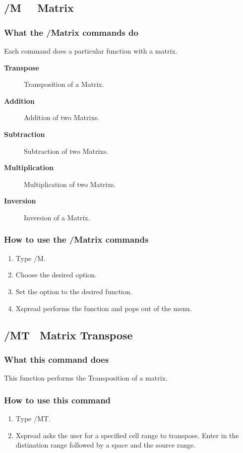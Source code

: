 \subsection*{/M \ \      Matrix}

\subsubsection*{What the /Matrix commands do}
Each command does a particular function with a matrix.

\begin{description}
\item[{\bf Transpose}]{Transposition of a Matrix.}
\item[{\bf Addition}]{Addition of two Matrixs.}
\item[{\bf Subtraction}]{Subtraction of two Matrixs.}
\item[{\bf Multiplication}]{Multiplication of two Matrixs.}
\item[{\bf Inversion}]{Inversion of a Matrix.}
\end{description}

\subsubsection*{How to use the /Matrix commands}
\begin{enumerate}
\item{Type /M.}
\item{Choose the desired option.}
\item{Set the option to the desired function.}
\item{Xspread performs the function and pops out of the menu.}
\end{enumerate}

\subsection*{/MT \      Matrix Transpose}

\subsubsection*{What this command does}
This function performs the Transposition of a matrix.

\subsubsection*{How to use this command}
\begin{enumerate}
\item{Type /MT.}
\item{Xspread asks the user for a specified cell range to transpose.  Enter in
      the distination range followed by a space and the source range.}
\end{enumerate}

